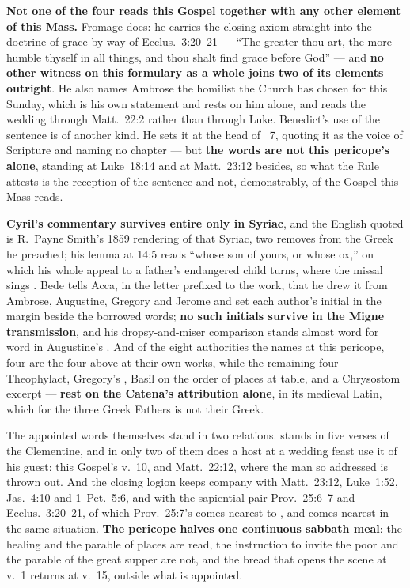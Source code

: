 \textbf{Not one of the four reads this Gospel together with any other element of
this Mass.} Fromage does: he carries the closing axiom straight into the
doctrine of grace by way of Ecclus.~3:20--21 --- ``The greater thou art, the more
humble thyself in all things, and thou shalt find grace before God'' --- and
\textbf{no other witness on this formulary as a whole joins two of its
elements outright}. He also names Ambrose the homilist the Church has chosen
for this Sunday, which is his own statement and rests on him alone, and reads the
wedding through Matt.~22:2 rather than through Luke. Benedict's use of the
sentence is of another kind. He sets it at the head of ~7, quoting
it as the voice of Scripture and naming no chapter --- but \textbf{the words are
not this pericope's alone}, standing at Luke~18:14 and at Matt.~23:12 besides, so
what the Rule attests is the reception of the sentence and not, demonstrably, of
the Gospel this Mass reads.

\textbf{Cyril's commentary survives entire only in Syriac}, and the English quoted is R.~Payne Smith's 1859 rendering of that
Syriac, two removes from the Greek he preached; his lemma at 14:5 reads ``whose
son of yours, or whose ox,'' on which his whole appeal to a father's endangered
child turns, where the missal sings . Bede tells Acca, in the
letter prefixed to the work, that he drew it from Ambrose, Augustine, Gregory and
Jerome and set each author's initial in the margin beside the borrowed words;
\textbf{no such initials survive in the Migne transmission}, and his
dropsy-and-miser comparison stands almost word for word in Augustine's
. And of the eight authorities the  names at
this pericope, four are the four above at their own works, while the remaining
four --- Theophylact, Gregory's , Basil on the order of places at
table, and a Chrysostom excerpt --- \textbf{rest on the Catena's attribution alone}, in
its medieval Latin, which for the three Greek Fathers is not their Greek.

The appointed words themselves stand in two relations.  stands in
five verses of the Clementine, and in only two of them does a host at a wedding
feast use it of his guest: this Gospel's v.~10, and Matt.~22:12, where the man so
addressed is thrown out. And the closing logion keeps company with Matt.~23:12,
Luke~1:52, Jas.~4:10 and 1~Pet.~5:6, and with the sapiential pair Prov.~25:6--7
and Ecclus.~3:20--21, of which Prov.~25:7's  comes nearest to
, and comes nearest in the same situation.
\textbf{The pericope halves one continuous sabbath meal}: the healing and the
parable of places are read, the instruction to invite the poor and the parable of
the great supper are not, and the bread that opens the scene at v.~1 returns at
v.~15, outside what is appointed.

